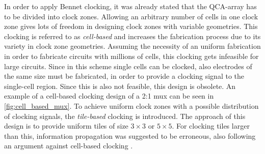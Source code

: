 In order to apply Bennet clocking, it was already stated that the QCA-array has to be divided into clock zones. Allowing an arbitrary number of cells in one clock zone gives lots of freedom in designing clock zones with variable geometries. This clocking is referred to as \textit{cell-based} and increases the fabrication process due to its variety in clock zone geometries. Assuming the necessity of an uniform fabrication in order to fabricate circuits with millions of cells, this clocking gets infeasible for large circuits. Since in this scheme single cells can be clocked, also electrodes of the same size must be fabricated, in order to provide a clocking signal to the single-cell region. Since this is also not feasible, this design is obsolete. An example of a cell-based clocking design of a 2:1 mux can be seen in \ref{fig:cell_based_mux}. To achieve uniform clock zones with a possible distribution of clocking signals, the \textit{tile-based} clocking is introduced. The approach of this design is to provide uniform tiles of size $3 \times 3$ or $5 \times 5$. For clocking tiles larger than this, information propagation was suggested to be erroneous, also following an argument against cell-based clocking \cite{taucer2015consequences}.


